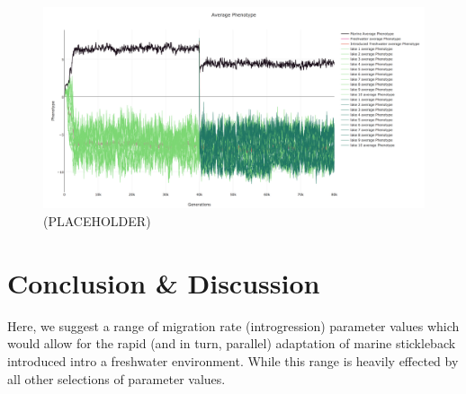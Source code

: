 \documentclass{article}
\begin{document}
\begin{figure}[h!tb]
	\begin{center}
  		\includegraphics[width=0.7\linewidth]{plotlyPlots/PhenotypeThroughout5e-2.png}
  		\caption{(PLACEHOLDER)
		}
  		\label{fig:Haplo4}
	\end{center}
\end{figure}

\section{Conclusion \& Discussion}


Here, we suggest a range of migration rate (introgression) parameter values which would allow for the rapid (and in turn, parallel) adaptation 
of marine stickleback introduced intro a freshwater environment.
While this range is heavily effected by all other selections of parameter values. 

\newpage
{}

\end{document}
